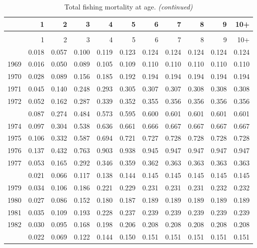 \documentclass[
]{article}
\begin{document}
\begin{longtable}[t]{lrrrrrrrrrr}
\caption{\label{tab:FAA-tot-table}Total fishing mortality at age.}\\
\toprule
  & 1 & 2 & 3 & 4 & 5 & 6 & 7 & 8 & 9 & 10+\\
\midrule
\endfirsthead
\caption[]{Total fishing mortality at age. \textit{(continued)}}\\
\toprule
  & 1 & 2 & 3 & 4 & 5 & 6 & 7 & 8 & 9 & 10+\\
\midrule
\endhead

\endfoot
\bottomrule
\endlastfoot
1968 & 0.018 & 0.057 & 0.100 & 0.119 & 0.123 & 0.124 & 0.124 & 0.124 & 0.124 & 0.124\\
1969 & 0.016 & 0.050 & 0.089 & 0.105 & 0.109 & 0.110 & 0.110 & 0.110 & 0.110 & 0.110\\
1970 & 0.028 & 0.089 & 0.156 & 0.185 & 0.192 & 0.194 & 0.194 & 0.194 & 0.194 & 0.194\\
1971 & 0.045 & 0.140 & 0.248 & 0.293 & 0.305 & 0.307 & 0.307 & 0.308 & 0.308 & 0.308\\
1972 & 0.052 & 0.162 & 0.287 & 0.339 & 0.352 & 0.355 & 0.356 & 0.356 & 0.356 & 0.356\\
\addlinespace
1973 & 0.087 & 0.274 & 0.484 & 0.573 & 0.595 & 0.600 & 0.601 & 0.601 & 0.601 & 0.601\\
1974 & 0.097 & 0.304 & 0.538 & 0.636 & 0.661 & 0.666 & 0.667 & 0.667 & 0.667 & 0.667\\
1975 & 0.106 & 0.332 & 0.587 & 0.694 & 0.721 & 0.727 & 0.728 & 0.728 & 0.728 & 0.728\\
1976 & 0.137 & 0.432 & 0.763 & 0.903 & 0.938 & 0.945 & 0.947 & 0.947 & 0.947 & 0.947\\
1977 & 0.053 & 0.165 & 0.292 & 0.346 & 0.359 & 0.362 & 0.363 & 0.363 & 0.363 & 0.363\\
\addlinespace
1978 & 0.021 & 0.066 & 0.117 & 0.138 & 0.144 & 0.145 & 0.145 & 0.145 & 0.145 & 0.145\\
1979 & 0.034 & 0.106 & 0.186 & 0.221 & 0.229 & 0.231 & 0.231 & 0.231 & 0.232 & 0.232\\
1980 & 0.027 & 0.086 & 0.152 & 0.180 & 0.187 & 0.189 & 0.189 & 0.189 & 0.189 & 0.189\\
1981 & 0.035 & 0.109 & 0.193 & 0.228 & 0.237 & 0.239 & 0.239 & 0.239 & 0.239 & 0.239\\
1982 & 0.030 & 0.095 & 0.168 & 0.198 & 0.206 & 0.208 & 0.208 & 0.208 & 0.208 & 0.208\\
\addlinespace
1983 & 0.022 & 0.069 & 0.122 & 0.144 & 0.150 & 0.151 & 0.151 & 0.151 & 0.151 & 0.151\\

\end{longtable}
\end{document}
